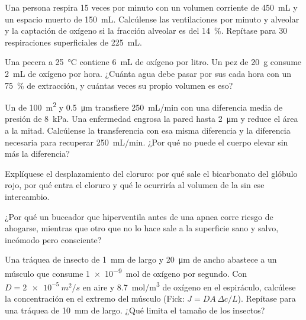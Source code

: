 \begin{exercise}[$\star\star$]\label{exo:b1:gas-exchange:5}
Una persona respira \qty{15}{} veces por minuto con un volumen corriente de
\qty{450}{mL} y un espacio muerto de \qty{150}{mL}. Calcúlense las
ventilaciones por minuto y alveolar y la captación de oxígeno si la fracción
alveolar es del \qty{14}{\%}. Repítase para \qty{30}{} respiraciones
superficiales de \qty{225}{mL}.
\end{exercise}

\begin{exercise}[$\star\star$]\label{exo:b1:gas-exchange:6}
Una pecera a \qty{25}{\celsius} contiene \qty{6}{mL} de oxígeno por litro.
Un pez de \qty{20}{g} consume \qty{2}{mL} de oxígeno por hora. ¿Cuánta agua
debe pasar por sus  cada hora con un \qty{75}{\%} de extracción, y
cuántas veces su propio volumen es eso?
\end{exercise}

\begin{exercise}[$\star\star$]\label{exo:b1:gas-exchange:7}
Un  de \qty{100}{m^2} y \qty{0.5}{\micro m} transfiere
\qty{250}{mL/min} con una diferencia media de presión de \qty{8}{kPa}. Una
enfermedad engrosa la pared hasta \qty{2}{\micro m} y reduce el área a la
mitad. Calcúlense la transferencia con esa misma diferencia y la diferencia
necesaria para recuperar \qty{250}{mL/min}. ¿Por qué no puede el cuerpo
elevar sin más la diferencia?
\end{exercise}

\begin{exercise}[$\star\star$]\label{exo:b1:gas-exchange:8}
Explíquese el desplazamiento del cloruro: por qué sale el bicarbonato del
glóbulo rojo, por qué entra el cloruro y qué le ocurriría al volumen de la
 sin ese intercambio.
\end{exercise}

\begin{exercise}[$\star\star$]\label{exo:b1:gas-exchange:9}
¿Por qué un buceador que hiperventila antes de una apnea corre riesgo de
ahogarse, mientras que otro que no lo hace sale a la superficie sano y
salvo, incómodo pero consciente?
\end{exercise}

\begin{exercise}[$\star\star\star$]\label{exo:b1:gas-exchange:10}
Una tráquea de insecto de \qty{1}{mm} de largo y \qty{20}{\micro m} de ancho
abastece a un músculo que consume \qty{1e-9}{mol} de oxígeno por segundo.
Con $D = \qty{2e-5}{m^2/s}$ en aire y \qty{8.7}{mol/m^3} de oxígeno en el
espiráculo, calcúlese la concentración en el extremo del músculo (Fick:
$J = DA\,\Delta c/L$). Repítase para una tráquea de \qty{10}{mm} de largo.
¿Qué limita el tamaño de los insectos?
\end{exercise}


